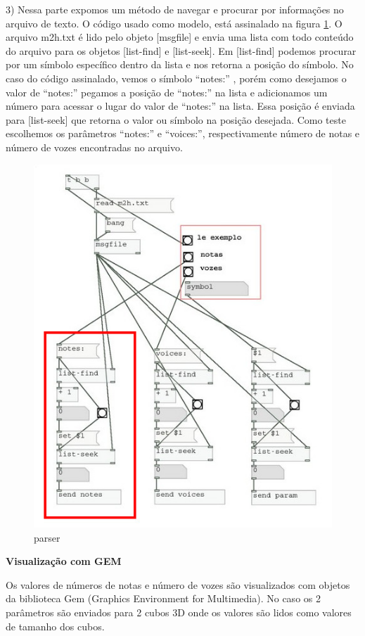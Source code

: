 \documentclass[draft]{ppgmus}
\begin{document}
3) Nessa parte expomos um método de navegar e procurar por
informações no arquivo de texto. O código usado como modelo,
está assinalado na figura \ref{parser}. O arquivo m2h.txt
é lido pelo objeto [msgfile] e envia uma lista com todo conteúdo
do arquivo para os objetos [list-find] e [list-seek]. Em [list-find]
podemos procurar por um símbolo específico dentro da lista e nos retorna
a posição do símbolo. No caso do código assinalado, vemos o símbolo 
``notes:'' , porém como desejamos o valor de ``notes:'' pegamos a posição
de ``notes:'' na lista e adicionamos um número para acessar o lugar do valor de
``notes:'' na lista. Essa posição é enviada para [list-seek] que retorna o valor ou
símbolo na posição desejada. Como teste escolhemos os parâmetros ``notes:'' e ``voices:'', 
respectivamente número de notas e número de vozes encontradas no arquivo.


\begin{figure}
\includegraphics[scale=.5]{parser00}
\caption{parser}
\label{parser}
\end{figure} 


\textbf{Visualização com GEM}


  Os valores de números de notas e número de vozes são visualizados
com objetos da biblioteca Gem (Graphics Environment for Multimedia).
No caso os 2 parâmetros são enviados para 2 cubos 3D onde os valores
são lidos como valores de tamanho dos cubos.
\end{document}
